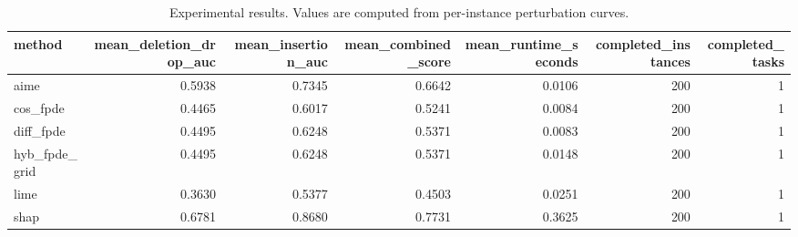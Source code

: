 \begin{table}[t]
\caption{Experimental results. Values are computed from per-instance perturbation curves.}
\label{tab:main_results_computed}
\centering
\begin{tabular}{lrrrrrr}
\toprule
method & mean\_deletion\_drop\_auc & mean\_insertion\_auc & mean\_combined\_score & mean\_runtime\_seconds & completed\_instances & completed\_tasks \\
\midrule
aime & 0.5938 & 0.7345 & 0.6642 & 0.0106 & 200 & 1 \\
cos\_fpde & 0.4465 & 0.6017 & 0.5241 & 0.0084 & 200 & 1 \\
diff\_fpde & 0.4495 & 0.6248 & 0.5371 & 0.0083 & 200 & 1 \\
hyb\_fpde\_grid & 0.4495 & 0.6248 & 0.5371 & 0.0148 & 200 & 1 \\
lime & 0.3630 & 0.5377 & 0.4503 & 0.0251 & 200 & 1 \\
shap & 0.6781 & 0.8680 & 0.7731 & 0.3625 & 200 & 1 \\
\bottomrule
\end{tabular}

\end{table}
